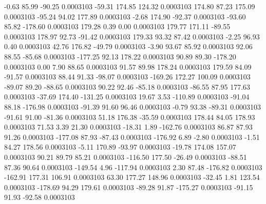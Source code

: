        -0.63       85.99      -90.25     0.0003103
      -59.31      174.85      124.32     0.0003103
      174.80       87.23      175.09     0.0003103
      -95.24       94.02      177.89     0.0003103
       -2.68      174.90      -92.37     0.0003103
      -93.60       85.82     -178.60     0.0003103
      179.28        0.39        0.00     0.0003103
      179.77      171.11      -89.55     0.0003103
      178.97       92.73      -91.42     0.0003103
      179.33       93.32       87.42     0.0003103
       -2.25       96.93        0.40     0.0003103
       42.76      176.82      -49.79     0.0003103
       -3.90       93.67       85.92     0.0003103
       92.06       88.55      -85.68     0.0003103
     -177.25       92.13      178.22     0.0003103
       90.89       89.30     -178.20     0.0003103
        0.00        7.90       88.65     0.0003103
       91.57       89.98      178.24     0.0003103
      179.59       84.09      -91.57     0.0003103
       88.44       91.33      -98.07     0.0003103
     -169.26      172.27      100.09     0.0003103
      -89.07       89.20      -88.65     0.0003103
       90.22       92.46      -85.18     0.0003103
      -86.55       87.95      177.63     0.0003103
      -37.69      174.40     -131.25     0.0003103
       19.67        3.53     -110.89     0.0003103
      -91.04       88.18     -176.98     0.0003103
      -91.39       91.60       96.46     0.0003103
       -0.79       93.38      -89.31     0.0003103
      -91.61       91.00      -81.36     0.0003103
       51.18      176.38      -35.59     0.0003103
      178.44       84.05      178.93     0.0003103
       71.53        3.39       21.30     0.0003103
      -18.31        1.89     -162.76     0.0003103
       86.87       87.93       91.26     0.0003103
     -177.08       87.93      -87.43     0.0003103
     -176.92        6.89       -2.80     0.0003103
       -1.51       84.27      178.56     0.0003103
       -5.11      170.89      -93.97     0.0003103
      -19.78      174.08      157.07     0.0003103
       90.21       89.79       85.21     0.0003103
     -116.50      177.50      -26.49     0.0003103
      -88.51       87.36       90.64     0.0003103
     -149.54        4.96     -117.94     0.0003103
        2.30       87.48     -176.82     0.0003103
     -162.91      177.31      106.91     0.0003103
       63.30      177.27      148.96     0.0003103
      -32.45        1.81      123.54     0.0003103
     -178.69       94.29      179.61     0.0003103
      -89.28       91.87     -175.27     0.0003103
      -91.15       91.93      -92.58     0.0003103
